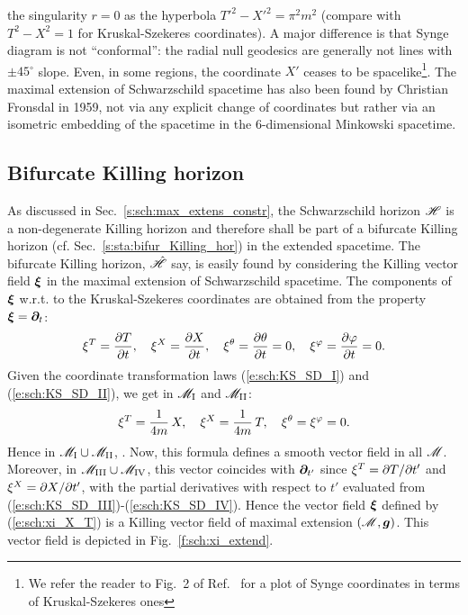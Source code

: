 \begin{hist}
the singularity $r=0$ as the hyperbola $T'^2 - X'^2 = \pi^2 m^2$ (compare with
$T^2-X^2 = 1$ for Kruskal-Szekeres coordinates). A major difference is that
Synge diagram is not ``conformal'': the radial null geodesics are generally not
lines with $\pm 45^\circ$ slope. Even, in some regions, the coordinate $X'$
ceases to be spacelike\footnote{We refer the reader to Fig.~2 of Ref.~\cite{Unruh14}
for a plot of Synge coordinates in terms of Kruskal-Szekeres ones}.
The maximal extension of Schwarzschild spacetime
has also been found by Christian Fronsdal \cite{Frons59} in 1959, not via any explicit change of coordinates but rather via
an isometric embedding of the spacetime in the 6-dimensional Minkowski spacetime.
\end{hist}


\subsection{Bifurcate Killing horizon} \label{s:max:bifur_Kill_hor}

As discussed in Sec.~\ref{s:sch:max_extens_constr}, the Schwarzschild horizon
$\mathscr{H}$ is
a non-degenerate Killing horizon and therefore shall be part of
a bifurcate Killing horizon (cf. Sec.~\ref{s:sta:bifur_Killing_hor})
in the extended spacetime.
The bifurcate Killing horizon, $\hat{\mathscr{H}}$ say, is easily found by
considering the Killing vector field $\bm{\xi}$ in the maximal extension
of Schwarzschild spacetime. The components of $\bm{\xi}$ w.r.t. to the
Kruskal-Szekeres coordinates are obtained from the
property $\bm{\xi} = \bm{\partial}_t$:
\[
    \xi^T = \frac{\partial T}{\partial t}, \quad
    \xi^X = \frac{\partial X}{\partial t}, \quad
    \xi^\theta = \frac{\partial \theta}{\partial t} = 0, \quad
    \xi^\varphi = \frac{\partial \varphi}{\partial t} = 0 .
\]
Given the coordinate transformation laws (\ref{e:sch:KS_SD_I})
and (\ref{e:sch:KS_SD_II}), we get in
$\mathscr{M}_{\rm I}$ and $\mathscr{M}_{\rm II}$:
\[
    \xi^T = \frac{1}{4m} \, X, \quad
    \xi^X = \frac{1}{4m} \, T , \quad
    \xi^\theta = \xi^\varphi = 0 .
\]
Hence in $\mathscr{M}_{\rm I}\cup\mathscr{M}_{\rm II}$,
\be \label{e:sch:xi_X_T}
    .
\ee
Now, this formula defines a smooth vector field in all $\mathscr{M}$.
Moreover, in $\mathscr{M}_{\rm III}\cup\mathscr{M}_{\rm IV}$, this vector coincides with
$\bm{\partial}_{t'}$ since $\xi^T = {\partial T}/{\partial t'}$ and $\xi^X = {\partial X}/{\partial t'}$,
with the partial derivatives with respect to $t'$ evaluated from
(\ref{e:sch:KS_SD_III})-(\ref{e:sch:KS_SD_IV}). Hence the vector field
$\bm{\xi}$ defined by (\ref{e:sch:xi_X_T}) is a Killing vector field
of maximal extension $(\mathscr{M},\bm{g})$. This vector field is depicted in
Fig.~\ref{f:sch:xi_extend}.

